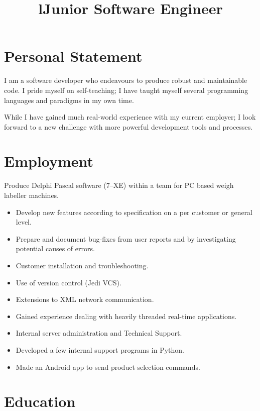 \documentclass[line,margin]{res}
\title{l} \location{r} \\
\newcommand{\dashsep}{--}
\newcommand{\rangesep}{\dashsep}
\begin{document}
\begin{resume}

\section{Personal Statement}
I am a software developer who endeavours to produce robust and maintainable code.
I pride myself on self-teaching; I have taught myself several programming languages and paradigms in my own time.

While I have gained much real-world experience with my current employer; I look forward to a new challenge with more powerful development tools and processes.

\section{Employment}

\title{Junior Software Engineer}
\dates{Sept 2010{\rangesep}Present}
\begin{position}
Produce Delphi Pascal software (7{\rangesep}XE) within a team for PC based weigh labeller machines.
\begin{itemize} \itemsep -2pt %
	\item Develop new features according to specification on a per customer or general level.
	\item Prepare and document bug-fixes from user reports and by investigating potential causes of errors.
	\item Customer installation and troubleshooting.
	\item Use of version control (Jedi VCS).
	\item Extensions to XML network communication.
	\item Gained experience dealing with heavily threaded real-time applications.
	\item Internal server administration and Technical Support.
	\item Developed a few internal support programs in Python. 
	\item Made an Android app to send product selection commands.
\end{itemize}
\end{position}

\section{Education}


\end{resume}
\end{document}

